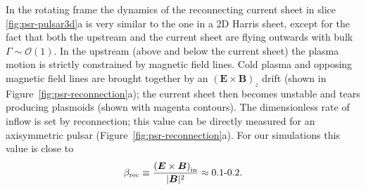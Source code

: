 In the rotating frame the dynamics of the reconnecting current sheet in slice \ref{fig:psr-pulsar3d}a is very similar to the one in a 2D Harris sheet, except for the fact that both the upstream and the current sheet are flying outwards with bulk $\Gamma\sim \mathcal{O}(1)$. In the upstream (above and below the current sheet) the plasma motion is strictly constrained by magnetic field lines. Cold plasma and opposing magnetic field lines are brought together by an $\left(\bm{E}\times\bm{B}\right)_z$ drift (shown in Figure~\ref{fig:psr-reconnection}a); the current sheet then becomes unstable and tears producing plasmoids (shown with magenta contours). The dimensionless rate of inflow is set by reconnection; this value can be directly measured for an axisymmetric pulsar (Figure~\ref{fig:psr-reconnection}a). For our simulations this value is close to
\begin{equation}
    \beta_{\rm rec} \equiv \frac{\left(\bm{E}\times\bm{B}\right)_{\rm in}}{|\bm{B}|^2} \approx 0.1\text{-}0.2.
\end{equation}

\begin{figure}[htb]
\end{figure}

